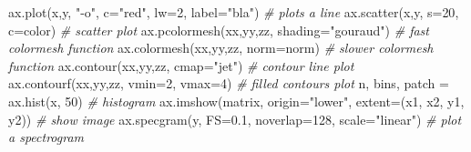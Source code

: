 \documentclass[]{article}
\newenvironment{Shaded}{}{}
\newcommand{\DecValTok}[1]{\textcolor[rgb]{0.25,0.63,0.44}{{#1}}}
\newcommand{\FloatTok}[1]{\textcolor[rgb]{0.25,0.63,0.44}{{#1}}}
\newcommand{\StringTok}[1]{\textcolor[rgb]{0.25,0.44,0.63}{{#1}}}
\newcommand{\CommentTok}[1]{\textcolor[rgb]{0.38,0.63,0.69}{\textit{{#1}}}}
\newcommand{\NormalTok}[1]{{#1}}
\begin{document}
\begin{Shaded}
\begin{Highlighting}[]
\NormalTok{ax.plot(x,y, }\StringTok{"-o"}\NormalTok{, c=}\StringTok{"red"}\NormalTok{, lw=}\DecValTok{2}\NormalTok{, label=}\StringTok{"bla"}\NormalTok{) }\CommentTok{# plots a line}
\NormalTok{ax.scatter(x,y, s=}\DecValTok{20}\NormalTok{, c=color) }\CommentTok{# scatter plot}
\NormalTok{ax.pcolormesh(xx,yy,zz, shading=}\StringTok{"gouraud"}\NormalTok{) }\CommentTok{# fast colormesh function}
\NormalTok{ax.colormesh(xx,yy,zz, norm=norm) }\CommentTok{# slower colormesh function}
\NormalTok{ax.contour(xx,yy,zz, cmap=}\StringTok{"jet"}\NormalTok{) }\CommentTok{# contour line plot}
\NormalTok{ax.contourf(xx,yy,zz, vmin=}\DecValTok{2}\NormalTok{, vmax=}\DecValTok{4}\NormalTok{) }\CommentTok{# filled contours plot}
\NormalTok{n, bins, patch = ax.hist(x, }\DecValTok{50}\NormalTok{) }\CommentTok{# histogram}
\NormalTok{ax.imshow(matrix, origin=}\StringTok{"lower"}\NormalTok{, extent=(x1, x2, y1, y2)) }\CommentTok{# show image}
\NormalTok{ax.specgram(y, FS=}\FloatTok{0.1}\NormalTok{, noverlap=}\DecValTok{128}\NormalTok{, scale=}\StringTok{"linear"}\NormalTok{) }\CommentTok{# plot a spectrogram}
\end{Highlighting}
\end{Shaded}
\end{document}
